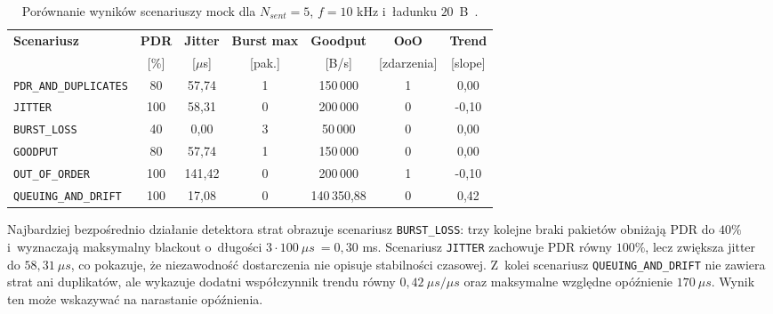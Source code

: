 \begin{table}[htbp]
    \centering
    \caption{Porównanie wyników scenariuszy mock dla $N_{sent}=5$, $f=10$ kHz i~ładunku $20$~B~\cite{espy_nexus_python_host}.}
    \label{tab:qos_mock_results}
    \begin{tabular}{|l|c|c|c|c|c|c|}
        \hline
        \textbf{Scenariusz}           & \textbf{PDR} & \textbf{Jitter} & \textbf{Burst max} & \textbf{Goodput} & \textbf{OoO} & \textbf{Trend} \\
                                      & [\%]         & [$\mu$s]        & [pak.]             & [B/s]            & [zdarzenia]  & [slope]        \\
        \hline
        \texttt{PDR\_AND\_DUPLICATES} & 80           & 57,74           & 1                  & 150\,000         & 1            & 0,00           \\
        \texttt{JITTER}               & 100          & 58,31           & 0                  & 200\,000         & 0            & -0,10          \\
        \texttt{BURST\_LOSS}          & 40           & 0,00            & 3                  & 50\,000          & 0            & 0,00           \\
        \texttt{GOODPUT}              & 80           & 57,74           & 1                  & 150\,000         & 0            & 0,00           \\
        \texttt{OUT\_OF\_ORDER}       & 100          & 141,42          & 0                  & 200\,000         & 1            & -0,10          \\
        \texttt{QUEUING\_AND\_DRIFT}  & 100          & 17,08           & 0                  & 140\,350,88      & 0            & 0,42           \\
        \hline
    \end{tabular}
\end{table}

Najbardziej bezpośrednio działanie detektora strat obrazuje scenariusz \texttt{BURST\_LOSS}: trzy kolejne braki pakietów obniżają PDR do $40\%$ i~wyznaczają maksymalny blackout o~długości $3 \cdot 100~\mu s~= 0{,}30$ ms.
Scenariusz \texttt{JITTER} zachowuje PDR równy $100\%$, lecz zwiększa jitter do $58{,}31~\mu s$, co pokazuje, że niezawodność dostarczenia nie opisuje stabilności czasowej.
Z~kolei scenariusz \texttt{QUEUING\_AND\_DRIFT} nie zawiera strat ani duplikatów, ale wykazuje dodatni współczynnik trendu równy $0{,}42~\mu s/\mu s$ oraz maksymalne względne opóźnienie $170~\mu s$.
Wynik ten może wskazywać na narastanie opóźnienia.

